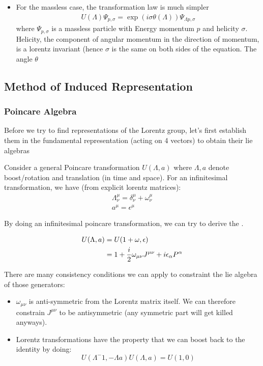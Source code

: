 \documentclass[12pt]{scrartcl}
\begin{document}
\begin{itemize}
\item For the massless case, the transformation law is much simpler
\begin{align}
U(\Lambda) \Psi_{p, \sigma} = \exp(i \sigma \theta(\Lambda)) \Psi_{\Lambda p, \sigma}
\end{align}
where  $\Psi_{p, \sigma}$ is a massless particle with Energy momentum $p$ and helicity $\sigma$.  Helicity,
the component of angular momentum in the direction of momentum, is a lorentz invariant (hence $\sigma$ is the same on both sides of the equation.
The angle $\theta$
\end{itemize}

\subsection{Method of Induced Representation}

\subsubsection{Poincare Algebra}
Before we try to find representations of the Lorentz group, let's first establish them in the fundamental representation (acting on 4 vectors) to obtain their lie algebras

Consider a general Poincare transformation $U(\Lambda, a)$ where $\Lambda, a$ denote boost/rotation and translation (in time and space). For an infinitesimal transformation, we have (from explicit lorentz matrices):
\begin{align}
\Lambda^\mu_\nu = \delta^\mu_\nu + \omega^\mu_\nu \\
a^\mu = \epsilon^\mu
\end{align}

By doing an infinitesimal poincare transformation, we can try to derive the .

\begin{align}
U(\Lambda, a) &= U(1 + \omega, \epsilon) \\
& = 1 + {i \over 2} \omega_{\mu \nu} J^{\mu \nu} + i \epsilon_\alpha P^{\alpha}
\end{align}

There are many consistency conditions we can apply to constraint the lie algebra of those generators:

\begin{itemize}
\item $\omega_{\mu \nu}$ is anti-symmetric from the Lorentz matrix itself.  We can therefore constrain $J^{\mu \nu}$ to be antisymmetric (any symmetric part will get killed anyways).
\item Lorentz transformations have the property that we can boost back to the identity by doing:
$$U(\Lambda^-1, -\Lambda a) U(\Lambda, a) = U(1, 0)$$
\end{itemize}
\end{document}
